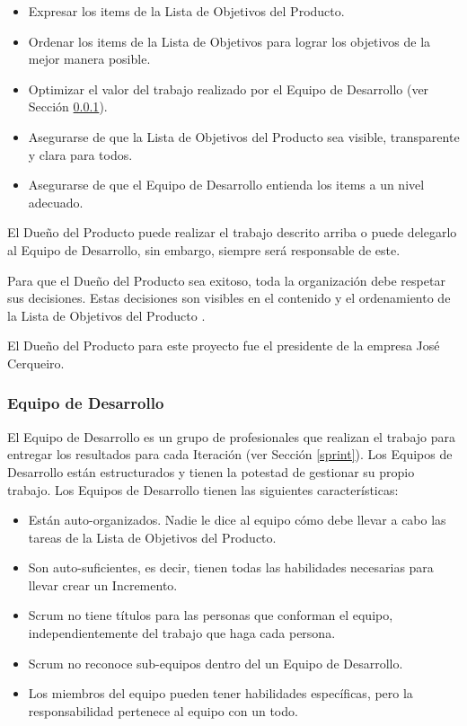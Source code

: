 \begin{itemize}
    \item Expresar los items de la Lista de Objetivos del Producto.
    \item Ordenar los items de la Lista de Objetivos para lograr los objetivos de la mejor manera posible.
    \item Optimizar el valor del trabajo realizado por el Equipo de Desarrollo (ver Sección \ref{developmentTeam}).
    \item Asegurarse de que la Lista de Objetivos del Producto sea visible, transparente y clara para todos.
    \item Asegurarse de que el Equipo de Desarrollo entienda los items a un nivel adecuado.
\end{itemize}

El Dueño del Producto puede realizar el trabajo descrito arriba o puede delegarlo al Equipo de Desarrollo, sin embargo, siempre será responsable de este.

Para que el Dueño del Producto sea exitoso, toda la organización debe respetar sus decisiones. Estas decisiones son visibles en el contenido y el ordenamiento de la Lista de Objetivos del Producto \cite{scrumSchwaber}.

El Dueño del Producto para este proyecto fue el presidente de la empresa José Cerqueiro.

\subsubsection{Equipo de Desarrollo} \label{developmentTeam}
El Equipo de Desarrollo es un grupo de profesionales que realizan el trabajo para entregar los resultados para cada Iteración (ver Sección \ref{sprint}). Los Equipos de Desarrollo están estructurados y tienen la potestad de gestionar su propio trabajo. Los Equipos de Desarrollo tienen las siguientes características:

\begin{itemize}
    \item Están auto-organizados. Nadie le dice al equipo cómo debe llevar a cabo las tareas de la Lista de Objetivos del Producto.
    \item Son auto-suficientes, es decir, tienen todas las habilidades necesarias para llevar crear un Incremento.
    \item Scrum no tiene títulos para las personas que conforman el equipo, independientemente del trabajo que haga cada persona.
    \item Scrum no reconoce sub-equipos dentro del un Equipo de Desarrollo.
    \item Los miembros del equipo pueden tener habilidades específicas, pero la responsabilidad pertenece al equipo con un todo. \cite{scrumSchwaber}
\end{itemize}

